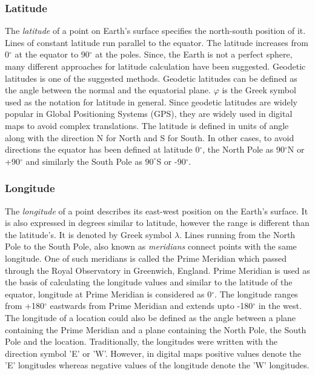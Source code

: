 \subsubsection{Latitude}
The \textit{latitude} of a point on Earth's surface specifies the north-south position of it. Lines of constant latitude run parallel to the equator. The latitude increases from 0$^{\circ}$ at the equator to 90$^{\circ}$ at the poles. Since, the Earth is not a perfect sphere, many different approaches for latitude calculation have been suggested. Geodetic latitudes is one of the suggested methods. Geodetic latitudes can be defined as the angle between the normal and the equatorial plane. $\varphi$ is the Greek symbol used as the notation for latitude in general. Since geodetic latitudes are widely popular in Global Positioning Systems (GPS), they are widely used in digital maps to avoid complex translations. The latitude is defined in units of angle along with the direction N for North and S for South. In other cases, to avoid directions the equator has been defined at latitude 0$^{\circ}$, the North Pole as 90$^{\circ}$N or +90$^{\circ}$ and similarly the South Pole as $90^{\circ}$S or -90$^{\circ}$. 

\subsubsection{Longitude}
The \textit{longitude} of a point describes its east-west position on the Earth's surface. It is also expressed in degrees similar to latitude, however the range is different than the latitude's. It is denoted by Greek symbol $\lambda$. Lines running from the North Pole to the South Pole, also known as \textit{meridians} connect points with the same longitude. One of such meridians is called the Prime Meridian which passed through the Royal Observatory in  Greenwich, England. Prime Meridian is used as the basis of calculating the longitude values and similar to the latitude of the equator, longitude at Prime Meridian is considered as 0$^{\circ}$. The longitude ranges from +180$^{\circ}$ eastwards from Prime Meridian and extends upto -180$^{\circ}$ in the west. The longitude of a location could also be defined as the angle between a plane containing the Prime Meridian and a plane containing the North Pole, the South Pole and the location. Traditionally, the longitudes were written with the direction symbol 'E' or 'W'. However, in digital maps positive values denote the 'E' longitudes whereas negative values of the longitude denote the 'W' longitudes.

